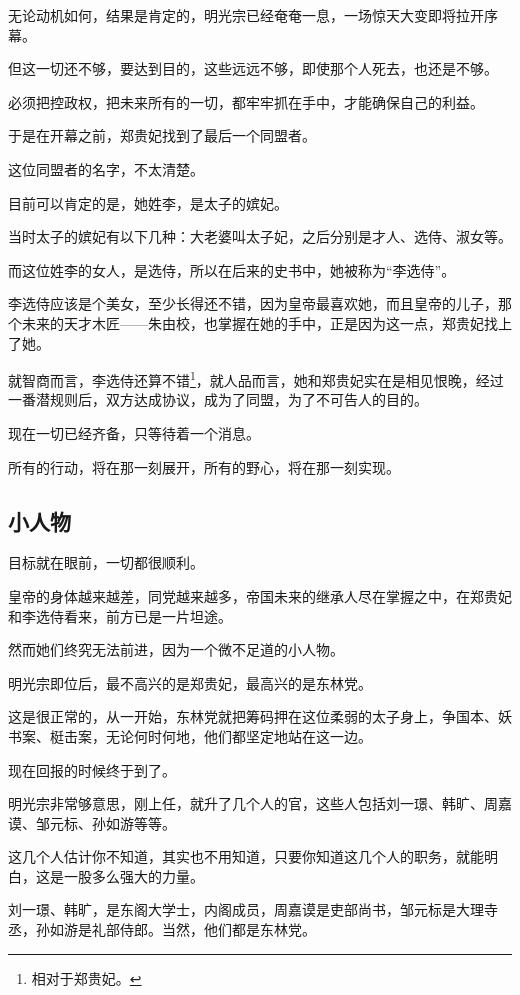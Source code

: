 \begin{multicols}{\theparacolNo}
		无论动机如何，结果是肯定的，明光宗已经奄奄一息，一场惊天大变即将拉开序幕。

		但这一切还不够，要达到目的，这些远远不够，即使那个人死去，也还是不够。

		必须把控政权，把未来所有的一切，都牢牢抓在手中，才能确保自己的利益。

		于是在开幕之前，郑贵妃找到了最后一个同盟者。

		这位同盟者的名字，不太清楚。

		目前可以肯定的是，她姓李，是太子的嫔妃。

		当时太子的嫔妃有以下几种：大老婆叫太子妃，之后分别是才人、选侍、淑女等。

		而这位姓李的女人，是选侍，所以在后来的史书中，她被称为“李选侍”。

		李选侍应该是个美女，至少长得还不错，因为皇帝最喜欢她，而且皇帝的儿子，那个未来的天才木匠——朱由校，也掌握在她的手中，正是因为这一点，郑贵妃找上了她。

		就智商而言，李选侍还算不错\footnote{相对于郑贵妃。}，就人品而言，她和郑贵妃实在是相见恨晚，经过一番潜规则后，双方达成协议，成为了同盟，为了不可告人的目的。

		现在一切已经齐备，只等待着一个消息。

		所有的行动，将在那一刻展开，所有的野心，将在那一刻实现。

		\subsection{小人物}
		目标就在眼前，一切都很顺利。

		皇帝的身体越来越差，同党越来越多，帝国未来的继承人尽在掌握之中，在郑贵妃和李选侍看来，前方已是一片坦途。

		然而她们终究无法前进，因为一个微不足道的小人物。

		明光宗即位后，最不高兴的是郑贵妃，最高兴的是东林党。

		这是很正常的，从一开始，东林党就把筹码押在这位柔弱的太子身上，争国本、妖书案、梃击案，无论何时何地，他们都坚定地站在这一边。

		现在回报的时候终于到了。

		明光宗非常够意思，刚上任，就升了几个人的官，这些人包括刘一璟、韩旷、周嘉谟、邹元标、孙如游等等。

		这几个人估计你不知道，其实也不用知道，只要你知道这几个人的职务，就能明白，这是一股多么强大的力量。

		刘一璟、韩旷，是东阁大学士，内阁成员，周嘉谟是吏部尚书，邹元标是大理寺丞，孙如游是礼部侍郎。当然，他们都是东林党。


\end{multicols}
